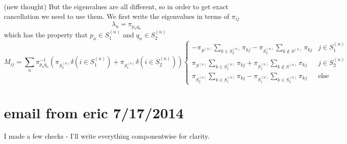 \documentclass[a4paper]{article}
\begin{document}
(new thought) But the eigenvalues are all different, so in order to get exact cancellation we need to use them.  We first write 
the eigenvalues in terms of $\pi_{ij}$
\begin{equation}
\lambda_n = \pi_{p_n q_n}
\end{equation}
which has the property that $p_n \in S_1^{(n)}$ and $q_n \in S_2^{(n)}$
\begin{equation}
M_{ij} = \sum_n \pi_{p_n q_n}^{-1} 
\left( \pi_{S_2^{(n)}} \delta \left(i \in S_1^{(n)}\right) 
+ \pi_{S_1^{(n)}} \delta \left(i  \in S_2^{(n)}\right) 
\right)
\begin{cases}
-\pi_{S^{(n)}}
\sum_{k \in S_2^{(n)}}  \pi_{kj}
-\pi_{S_2^{(n)}}
\sum_{k \notin S^{(n)}} \pi_{kj}
 & j \in S_1^{(n)} \\
\pi_{S^{(n)}}
\sum_{k \in S_1^{(n)}}  \pi_{kj}
+ \pi_{S_1^{(n)}}
\sum_{k \notin S^{(n)}} \pi_{kj}
& j \in S_2^{(n)} \\
\pi_{S_2^{(n)}} \sum_{k \in S_1^{(n)}}  \pi_{kj}
- 
\pi_{S_1^{(n)}} \sum_{k \in S_2^{(n)}}  \pi_{kj}
& \text{else}
\end{cases}
\end{equation}

\section{email from eric 7/17/2014}

I made a few checks - I’ll write everything componentwise for clarity.
\end{document}

